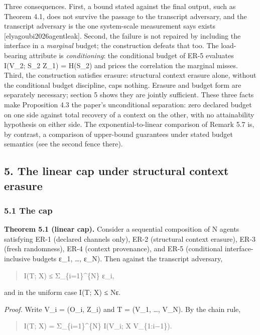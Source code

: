 \documentclass[
  11pt,
]{article}
\begin{document}
Three consequences. First, a bound stated against the final output, such
as Theorem 4.1, does not survive the passage to the transcript
adversary, and the transcript adversary is the one system-scale
measurement says exists {[}elyagoubi2026agentleak{]}. Second, the
failure is not repaired by including the interface in a \emph{marginal}
budget; the construction defeats that too. The load-bearing attribute is
\emph{conditioning}: the conditional budget of ER-5 evaluates I(V\_2;
S\_2 \textbar{} Z\_1) = H(S\_2) and prices the correlation the marginal
misses. Third, the construction satisfies erasure: structural context
erasure alone, without the conditional budget discipline, caps nothing.
Erasure and budget form are separately necessary; section 5 shows they
are jointly sufficient. These three facts make Proposition 4.3 the
paper's unconditional separation: zero declared budget on one side
against total recovery of a context on the other, with no attainability
hypothesis on either side. The exponential-to-linear comparison of
Remark 5.7 is, by contrast, a comparison of upper-bound guarantees under
stated budget semantics (see the second fence there).

\subsection{5. The linear cap under structural context
erasure}\label{the-linear-cap-under-structural-context-erasure}

\subsubsection{5.1 The cap}\label{the-cap}

\textbf{Theorem 5.1 (linear cap).} Consider a sequential composition of
N agents satisfying ER-1 (declared channels only), ER-2 (structural
context erasure), ER-3 (fresh randomness), ER-4 (context provenance),
and ER-5 (conditional interface-inclusive budgets ε\_1, \ldots, ε\_N).
Then against the transcript adversary,

\begin{quote}
I(T; X) ≤ Σ\_\{i=1\}\^{}\{N\} ε\_i,
\end{quote}

and in the uniform case I(T; X) ≤ Nε.

\emph{Proof.} Write V\_i = (O\_i, Z\_i) and T = (V\_1, \ldots, V\_N). By
the chain rule,

\begin{quote}
I(T; X) = Σ\_\{i=1\}\^{}\{N\} I(V\_i; X \textbar{} V\_\{1:i−1\}).
\end{quote}
\end{document}
